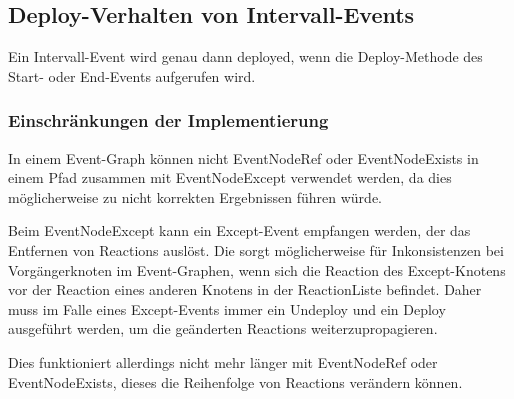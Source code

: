 \subsection{Deploy-Verhalten von Intervall-Events}
Ein Intervall-Event wird genau dann deployed, wenn die Deploy-Methode des Start-
oder End-Events aufgerufen wird. 


\subsubsection{Einschränkungen der Implementierung}
In einem Event-Graph können nicht EventNodeRef oder EventNodeExists in einem
Pfad zusammen mit EventNodeExcept verwendet werden, da dies möglicherweise zu
nicht korrekten Ergebnissen führen würde.

Beim EventNodeExcept kann ein Except-Event empfangen werden, der das Entfernen
von Reactions auslöst. Die sorgt möglicherweise für Inkonsistenzen
bei Vorgängerknoten im Event-Graphen, wenn sich die Reaction des Except-Knotens
vor der Reaction eines anderen Knotens in der ReactionListe befindet.
Daher muss im Falle eines Except-Events immer ein Undeploy und ein Deploy
ausgeführt  werden, um die geänderten Reactions weiterzupropagieren.

Dies funktioniert allerdings nicht mehr länger mit EventNodeRef oder
EventNodeExists, dieses die Reihenfolge von Reactions verändern können.
